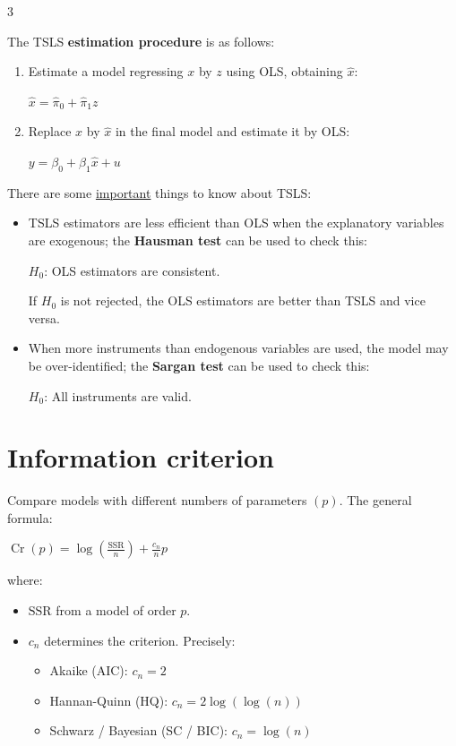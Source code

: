 \documentclass[10pt, a4paper, landscape]{article}
\DeclareMathOperator{\Cr}{Cr}
\newcommand{\SSR}{\text{SSR}}
\begin{document}
\begin{multicols}{3}
\begin{itemize}[leftmargin=*]
	The TSLS \textbf{estimation procedure} is as follows:
	\begin{enumerate}[leftmargin=*]
		\item Estimate a model regressing \( x \) by \( z \) using OLS, obtaining \( \hat{x} \):
		\begin{center}
			\( \hat{x} = \hat{\pi}_{0} + \hat{\pi}_{1} z \)
		\end{center}
		\item Replace \( x \) by \( \hat{x} \) in the final model and estimate it by OLS:
		\begin{center}
			\( y = \beta_{0} + \beta_{1} \hat{x}+ u \)
		\end{center}
	\end{enumerate}
	There are some \underline{important} things to know about TSLS:
	\begin{itemize}[leftmargin=*]
		\item TSLS estimators are less efficient than OLS when the explanatory variables are exogenous; the \textbf{Hausman test} can be used to check this:
		\begin{center}
			\( H_{0} \): OLS estimators are consistent.
		\end{center}
		If \( H_{0} \) is not rejected, the OLS estimators are better than TSLS and vice versa.
		\item When more instruments than endogenous variables are used, the model may be over-identified; the \textbf{Sargan test} can be used to check this:
		\begin{center}
			\( H_{0} \): All instruments are valid.
		\end{center}
	\end{itemize}
\end{itemize}

\columnbreak

\section*{Information criterion}

Compare models with different numbers of parameters \( (p) \). The general formula:

\begin{center}
	\( \Cr(p) = \log(\frac{\SSR}{n}) + \frac{c_{n}}{n} p \)
\end{center}

where:

\begin{itemize}[leftmargin=*]
	\item \( \SSR \) from a model of order \( p \).
	\item \( c_{n} \) determines the criterion. Precisely:
	\begin{itemize}[leftmargin=*]
		\item Akaike (AIC): \( c_{n} = 2 \)
		\item Hannan-Quinn (HQ): \( c_{n} = 2 \log(\log(n)) \)
		\item Schwarz / Bayesian (SC / BIC): \( c_{n} = \log(n) \)
	\end{itemize}
\end{itemize}


\end{multicols}
\end{document}
